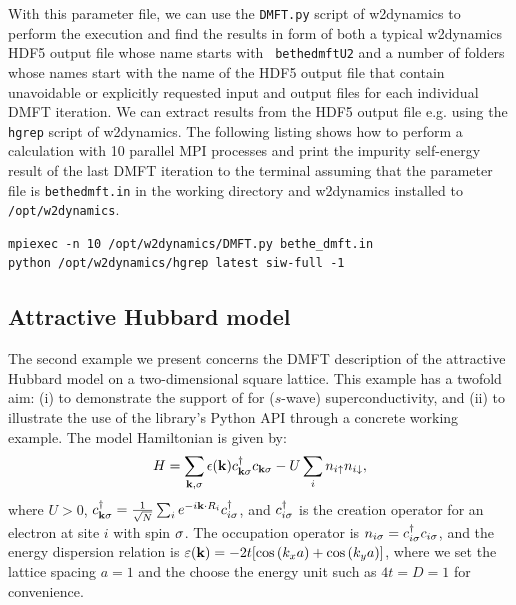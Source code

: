 \documentclass[edipack2.tex]{subfiles}
\begin{document}
With this parameter file, we can use the {\tt DMFT.py} script of
w2dynamics to perform the execution and find the results in form of
both a typical w2dynamics HDF5 output file whose name starts with {\tt
  bethe\textunderscore{}dmft\textunderscore{}U2} and a number of folders whose names start with the
name of the HDF5 output file that contain unavoidable or explicitly
requested \NAME input and output files for each individual DMFT
iteration. We can extract results from the HDF5 output file e.g. using
the {\tt hgrep} script of w2dynamics. The following listing shows how
to perform a calculation with 10 parallel MPI processes and print the
impurity self-energy result of the last DMFT iteration to the terminal
assuming that the parameter file is {\tt bethe\textunderscore{}dmft.in} in the working
directory and w2dynamics installed to {\tt /opt/w2dynamics}.

\begin{lstlisting}[style=mybash]
mpiexec -n 10 /opt/w2dynamics/DMFT.py bethe_dmft.in
python /opt/w2dynamics/hgrep latest siw-full -1
\end{lstlisting}



















\subsection{Attractive Hubbard model}\label{SecExamplesAHM}
The second example we present concerns the DMFT description of the 
attractive Hubbard model on a two-dimensional square lattice. This 
example has a twofold aim: (i) to demonstrate the support of \NAME 
for ($s$-wave) superconductivity, and (ii) to illustrate the use of 
the library's Python API through a concrete working example. The 
model Hamiltonian is given by:
$$
H = \sum_{{\bf k},\sigma} \epsilon({\bf k}) c^\dagger_{{\bf k}\sigma} c_{{\bf k}\sigma} 
    - U \sum_i n_{i\uparrow} n_{i\downarrow},
$$
where $U > 0$, $c^\dagger_{{\bf k}\sigma} = \tfrac{1}{\sqrt{N}} 
\sum_i e^{-i{\bf k} \cdot R_i} c^\dagger_{i\sigma}$, and $c^\dagger_{i\sigma}$ 
is the creation operator for an electron at site $i$ with spin $\sigma$. 
The occupation operator is $n_{i\sigma} = c^\dagger_{i\sigma} c_{i\sigma}$, and 
the energy dispersion relation is $\varepsilon({\bf k})=-2t[\cos{(k_x a)}+
\cos{(k_y a)}]$, where we set the lattice spacing 
$a=1$  and the choose the energy unit such as $4t=D=1$ for convenience.
\end{document}
